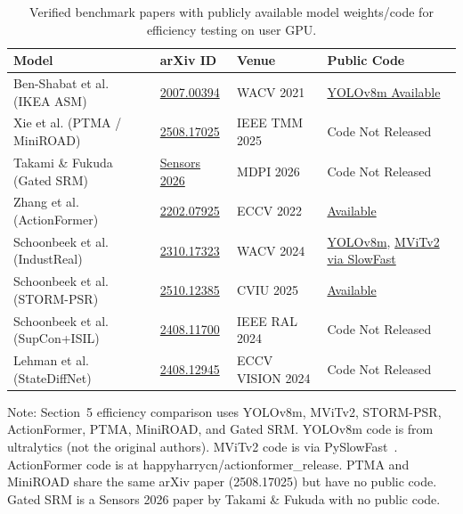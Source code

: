 \documentclass[11pt,a4paper]{article}
\begin{document}
\begin{table}[!htbp]
\centering
\small
\caption{Verified benchmark papers with publicly available model weights/code for efficiency testing on user GPU.}
\label{tab:verified-models}
\renewcommand{\arraystretch}{1.15}
\begin{tabular}{l l l l}
\toprule
\textbf{Model} & \textbf{arXiv ID} & \textbf{Venue} & \textbf{Public Code} \\
\midrule
Ben-Shabat et al. (IKEA ASM) & \href{https://arxiv.org/abs/2007.00394}{2007.00394} & WACV 2021 & \href{https://github.com/ultralytics/ultralytics}{YOLOv8m Available} \\
Xie et al. (PTMA / MiniROAD) & \href{https://arxiv.org/abs/2508.17025}{2508.17025} & IEEE TMM 2025 & Code Not Released \\
Takami \& Fukuda (Gated SRM) & \href{https://www.mdpi.com/1424-8220/26/8/2454}{Sensors 2026} & MDPI 2026 & Code Not Released \\
Zhang et al. (ActionFormer) & \href{https://arxiv.org/abs/2202.07925}{2202.07925} & ECCV 2022 & \href{https://github.com/happyharrycn/actionformer\_release}{Available} \\
Schoonbeek et al. (IndustReal) & \href{https://arxiv.org/abs/2310.17323}{2310.17323} & WACV 2024 & \href{https://github.com/ultralytics/ultralytics}{YOLOv8m}, \href{https://github.com/facebookresearch/SlowFast}{MViTv2 via SlowFast} \\
Schoonbeek et al. (STORM-PSR) & \href{https://arxiv.org/abs/2510.12385}{2510.12385} & CVIU 2025 & \href{https://github.com/shaohsuanhung/STORM-PSR}{Available} \\
Schoonbeek et al. (SupCon+ISIL) & \href{https://arxiv.org/abs/2408.11700}{2408.11700} & IEEE RAL 2024 & Code Not Released \\
Lehman et al. (StateDiffNet) & \href{https://arxiv.org/abs/2408.12945}{2408.12945} & ECCV VISION 2024 & Code Not Released \\
\bottomrule
\end{tabular}
\end{table}

\vspace{0.5em}
\footnotesize
Note: Section~5 efficiency comparison uses YOLOv8m, MViTv2, STORM-PSR, ActionFormer, PTMA, MiniROAD, and Gated SRM. YOLOv8m code is from ultralytics (not the original authors). MViTv2 code is via PySlowFast~\cite{schoonbeek2024industreal}. ActionFormer code is at happyharrycn/actionformer\_release. PTMA and MiniROAD share the same arXiv paper (2508.17025) but have no public code. Gated SRM is a Sensors 2026 paper by Takami \& Fukuda with no public code.
\end{document}
